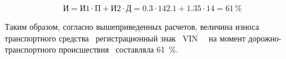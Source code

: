 \begin{equation}\label{eqsnosr}
\text{И} =\text{И1}\cdot\text{П}+\text{И2}\cdot \text{Д} = 0.3\cdot 142.1  + 1.35\cdot 14 = 61 \, \%
\end{equation}

Таким образом, согласно вышеприведенных расчетов, величина износа транспортного средства \, регистрационный знак \, VIN \, \vin\, на момент дорожно-транспортного происшествия \, составляла 61\, \%. 

%
%
%
%
